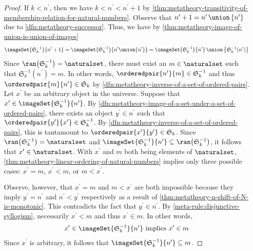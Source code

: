 \begin{proof}
    \vspace{0.3cm}
    \noindent
    If \( k < n^{\prime} \), then we have \( k < n^{\prime} < n^{\prime} + 1 \) by \cref{thm:metatheory-transitivity-of-membership-relation-for-natural-numbers}.
    Observe that \( n^{\prime} + 1 = n^{\prime} \,{\union}\, \mleft\{ n^{\prime} \mright\} \) due to \cref{dfn:metatheory-successor}.
    Thus, we have by \cref{thm:metatheory-image-of-union-is-union-of-images}
    \begin{equation*}
        \imageSet{\mathfrak{S}^{-1}_{k}}{n^{\prime} + 1} = \imageSet{\mathfrak{S}^{-1}_{k}}{n^{\prime} \union \mleft\{ n^{\prime} \mright\}}
        = \imageSet{\mathfrak{S}^{-1}_{k}}{n^{\prime}} \,{\union}\, \mleft\{ \mathfrak{S}^{-1}_{k}(n^{\prime}) \mright\}
    \end{equation*}
    Since \( \ran \mleft( \mathfrak{S}^{-1}_{k} \mright) = \naturalset\), there must exist an \( m \in \naturalset \) such that \( \mathfrak{S}^{-1}_{k}(n^{\prime}) = m \).
    In other words, \( \orderedpair{n^{\prime}}{m} \in \mathfrak{S}^{-1}_{k} \) and thus \( \orderedpair{m}{n^{\prime}} \in \mathfrak{S}_{k} \)
    by \cref{dfn:metatheory-inverse-of-a-set-of-ordered-pairs}.
    Let \( x^{\prime} \) be an arbitrary object in the universe.
    Suppose that \( x^{\prime} \in \imageSet{\mathfrak{S}^{-1}_{k}}{n^{\prime}} \).
    By \cref{dfn:metatheory-image-of-a-set-under-a-set-of-ordered-pairs}, there exists an object \( y^{\prime} \in n^{\prime} \)
    such that \( \orderedpair{y^{\prime}}{x^{\prime}} \in \mathfrak{S}^{-1}_{k} \).
    By \cref{dfn:metatheory-inverse-of-a-set-of-ordered-pairs}, this is tantamount to \( \orderedpair{x^{\prime}}{y^{\prime}} \in \mathfrak{S}_{k} \).
    Since \( \ran \mleft( \mathfrak{S}^{-1}_{k} \mright) = \naturalset \)
    and \( \imageSet{\mathfrak{S}^{-1}_{k}}{n^{\prime}} \subseteq \ran \mleft( \mathfrak{S}^{-1}_{k} \mright) \),
    it follows that \( x^{\prime} \in \naturalset \).
    With \( x^{\prime} \) and \( m \) both being elements of \( \naturalset \), \cref{thm:metatheory-linear-ordering-of-natural-numbers} implies only three possible cases:
    \( x^{\prime} = m \), \( x^{\prime} < m \), or \( m < x^{\prime} \).

    \vspace{0.3cm}
    \noindent
    Observe, however, that \( x^{\prime} = m \) and \( m < x^{\prime} \) are both impossible because they imply
    \( y^{\prime} = n^{\prime} \) and \( n^{\prime} < y^{\prime} \) respectively as a result of \cref{thm:metatheory-n-shift-of-N-is-monotonic}.
    This contradicts the fact that \( y^{\prime} \in n^{\prime} \).
    By \cref{meta-rule:disjunctive-syllogism}, necessarily \( x^{\prime} < m \) and thus \( x^{\prime} \in m \).
    In other words,
    \begin{equation*}
        x^{\prime} \in \imageSet{\mathfrak{S}^{-1}_{k}}{n^{\prime}} \ \text{implies} \ x^{\prime} \in m
    \end{equation*}
    Since \( x^{\prime} \) is arbitrary, it follows that \( \imageSet{\mathfrak{S}^{-1}_{k}}{n^{\prime}} \subseteq m \).


\end{proof}
